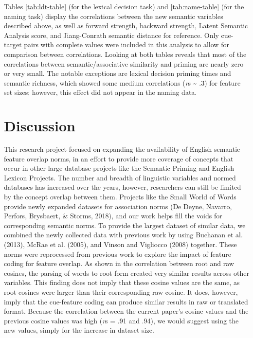 \documentclass[english,,man]{apa6}
\begin{document}
Tables \ref{tab:ldt-table} (for the lexical decision task) and \ref{tab:name-table} (for the naming task) display the correlations between the new semantic variables described above, as well as forward strength, backward strength, Latent Semantic Analysis score, and Jiang-Conrath semantic distance for reference. Only cue-target pairs with complete values were included in this analysis to allow for comparison between correlations. Looking at both tables reveals that most of the correlations between semantic/associative similarity and priming are nearly zero or very small. The notable exceptions are lexical decision priming times and semantic richness, which showed some medium correlations (\emph{r}s \textasciitilde{} .3) for feature set sizes; however, this effect did not appear in the naming data.

\hypertarget{discussion}{%
\section{Discussion}\label{discussion}}

This research project focused on expanding the availability of English semantic feature overlap norms, in an effort to provide more coverage of concepts that occur in other large database projects like the Semantic Priming and English Lexicon Projects. The number and breadth of linguistic variables and normed databases has increased over the years, however, researchers can still be limited by the concept overlap between them. Projects like the Small World of Words provide newly expanded datasets for association norms (De Deyne, Navarro, Perfors, Brysbaert, \& Storms, 2018), and our work helps fill the voids for corresponding semantic norms. To provide the largest dataset of similar data, we combined the newly collected data with previous work by using Buchanan et al. (2013), McRae et al. (2005), and Vinson and Vigliocco (2008) together. These norms were reprocessed from previous work to explore the impact of feature coding for feature overlap. As shown in the correlation between root and raw cosines, the parsing of words to root form created very similar results across other variables. This finding does not imply that these cosine values are the same, as root cosines were larger than their corresponding raw cosine. It does, however, imply that the cue-feature coding can produce similar results in raw or translated format. Because the correlation between the current paper's cosine values and the previous cosine values was high (\emph{r}s = .91 and .94), we would suggest using the new values, simply for the increase in dataset size.
\end{document}

